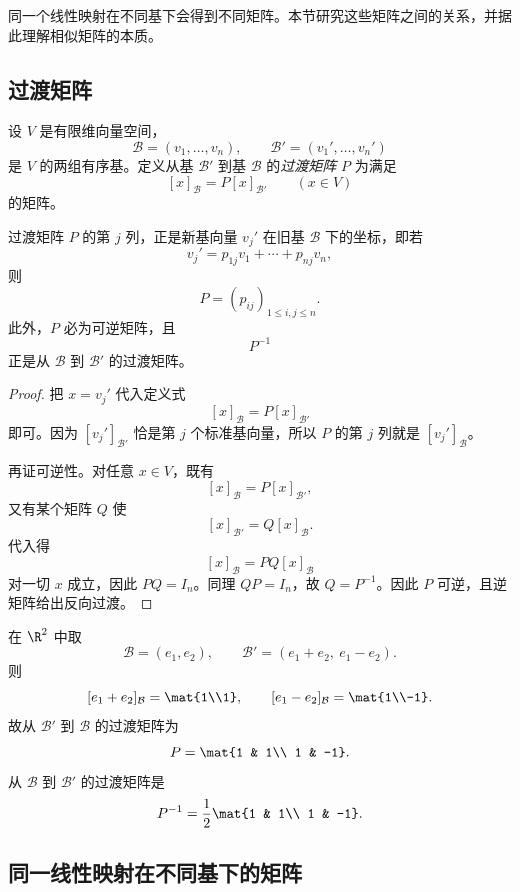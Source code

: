 同一个线性映射在不同基下会得到不同矩阵。本节研究这些矩阵之间的关系，并据此理解相似矩阵的本质。

\subsection{过渡矩阵}

\begin{definition}
设 $V$ 是有限维向量空间，
\[
  \mathcal B=(v_1,\dots,v_n),\qquad \mathcal B'=(v_1',\dots,v_n')
\]
是 $V$ 的两组有序基。定义从基 $\mathcal B'$ 到基 $\mathcal B$ 的\emph{过渡矩阵} $P$ 为满足
\[
  [x]_{\mathcal B}=P[x]_{\mathcal B'}\qquad (x\in V)
\]
的矩阵。
\end{definition}

\begin{proposition}
过渡矩阵 $P$ 的第 $j$ 列，正是新基向量 $v_j'$ 在旧基 $\mathcal B$ 下的坐标，即若
\[
  v_j'=p_{1j}v_1+\cdots+p_{nj}v_n,
\]
则
\[
  P=(p_{ij})_{1\le i,j\le n}.
\]
此外，$P$ 必为可逆矩阵，且
\[
  P^{-1}
\]
正是从 $\mathcal B$ 到 $\mathcal B'$ 的过渡矩阵。
\end{proposition}

\begin{proof}
把 $x=v_j'$ 代入定义式
\[
  [x]_{\mathcal B}=P[x]_{\mathcal B'}
\]
即可。因为 $[v_j']_{\mathcal B'}$ 恰是第 $j$ 个标准基向量，所以 $P$ 的第 $j$ 列就是 $[v_j']_{\mathcal B}$。

再证可逆性。对任意 $x\in V$，既有
\[
  [x]_{\mathcal B}=P[x]_{\mathcal B'},
\]
又有某个矩阵 $Q$ 使
\[
  [x]_{\mathcal B'}=Q[x]_{\mathcal B}.
\]
代入得
\[
  [x]_{\mathcal B}=PQ[x]_{\mathcal B}
\]
对一切 $x$ 成立，因此 $PQ=I_n$。同理 $QP=I_n$，故 $Q=P^{-1}$。因此 $P$ 可逆，且逆矩阵给出反向过渡。
\end{proof}

\begin{example}
在 $\R^2$ 中取
\[
  \mathcal B=(e_1,e_2),
  \qquad
  \mathcal B'=(e_1+e_2,\ e_1-e_2).
\]
则
\[
  [e_1+e_2]_{\mathcal B}=\mat{1\\1},
  \qquad
  [e_1-e_2]_{\mathcal B}=\mat{1\\-1}.
\]
故从 $\mathcal B'$ 到 $\mathcal B$ 的过渡矩阵为
\[
  P=\mat{1 & 1\\ 1 & -1}.
\]
从 $\mathcal B$ 到 $\mathcal B'$ 的过渡矩阵是
\[
  P^{-1}=\frac12\mat{1 & 1\\ 1 & -1}.
\]
\end{example}

\subsection{同一线性映射在不同基下的矩阵}


